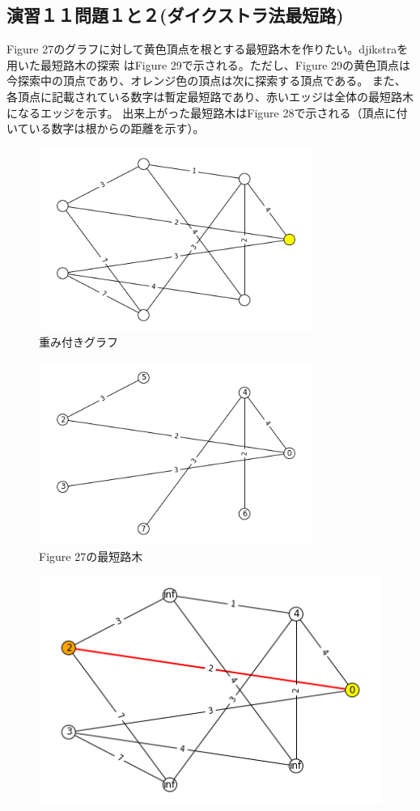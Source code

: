 \documentclass{report}
\begin{document}
\begin{CJK}{UTF8}{min}
    \clearpage
    \section*{演習１１問題１と２(ダイクストラ法最短路)}
    Figure 27のグラフに対して黄色頂点を根とする最短路木を作りたい。djikstraを用いた最短路木の探索
    はFigure 29で示される。ただし、Figure 29の黄色頂点は今探索中の頂点であり、オレンジ色の頂点は次に探索する頂点である。
    また、各頂点に記載されている数字は暫定最短路であり、赤いエッジは全体の最短路木になるエッジを示す。
    出来上がった最短路木はFigure 28で示される（頂点に付いている数字は根からの距離を示す）。
    \begin{figure}[!h]
        \centerline{\includegraphics[width=0.8\textwidth]{data/ex-11-start.png}}
        \caption{重み付きグラフ}
    \end{figure}
    \begin{figure}[!h]
        \centerline{\includegraphics[width=0.8\textwidth]{data/ex-11-res.png}}
        \caption{Figure 27の最短路木}
    \end{figure}
    \begin{figure}
        \includegraphics[width=.49\textwidth]{data/ex-11-D-1.png}\hfill

\end{figure}
\end{CJK}
\end{document}
